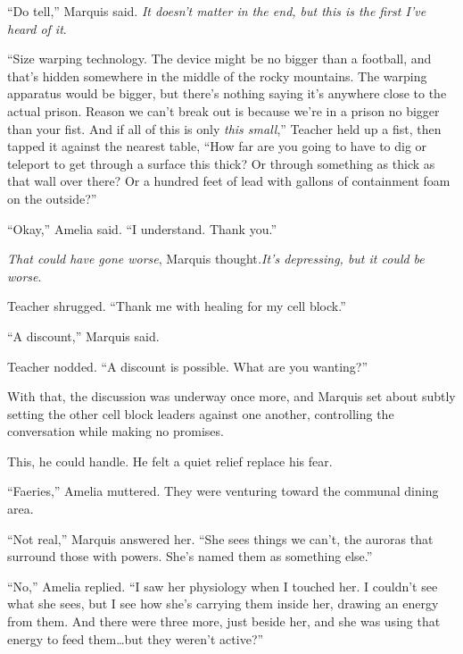 ``Do tell,'' Marquis said.  \emph{It doesn't matter in the end, but this is the first I've heard of it}.



``Size warping technology.  The device might be no bigger than a football, and that's hidden somewhere in the middle of the rocky mountains.  The warping apparatus would be bigger, but there's nothing saying it's anywhere close to the actual prison.  Reason we can't break out is because we're in a prison no bigger than your fist.  And if all of this is only \emph{this small},'' Teacher held up a fist, then tapped it against the nearest table, ``How far are you going to have to dig or teleport to get through a surface this thick?  Or through something as thick as that wall over there?  Or a hundred feet of lead with gallons of containment foam on the outside?''



``Okay,'' Amelia said.  ``I understand.  Thank you.''



\emph{That could have gone worse}, Marquis thought\emph{.}\emph{It's depressing, but it could be worse}.



Teacher shrugged.  ``Thank me with healing for my cell block.''



``A discount,'' Marquis said.



Teacher nodded.  ``A discount is possible.  What are you wanting?''



With that, the discussion was underway once more, and Marquis set about subtly setting the other cell block leaders against one another, controlling the conversation while making no promises.



This, he could handle.  He felt a quiet relief replace his fear.



\blacksquare



``Faeries,'' Amelia muttered.  They were venturing toward the communal dining area.



``Not real,'' Marquis answered her.  ``She sees things we can't, the auroras that surround those with powers.  She's named them as something else.''



``No,'' Amelia replied.  ``I saw her physiology when I touched her.  I couldn't see what she sees, but I see how she's carrying them inside her, drawing an energy from them.  And there were three more, just beside her, and she was using that energy to feed them\ldots but they weren't active?''



